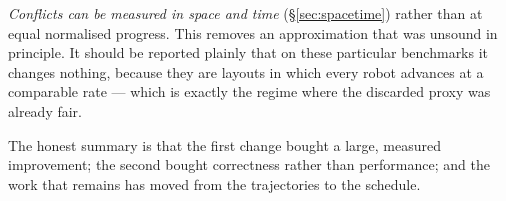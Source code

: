 \documentclass[11pt,a4paper]{article}
\begin{document}
\emph{Conflicts can be measured in space and time} (\S\ref{sec:spacetime}) rather than at
equal normalised progress. This removes an approximation that was unsound in principle. It
should be reported plainly that on these particular benchmarks it changes nothing, because
they are layouts in which every robot advances at a comparable rate --- which is exactly the
regime where the discarded proxy was already fair.

The honest summary is that the first change bought a large, measured improvement; the second
bought correctness rather than performance; and the work that remains has moved from the
trajectories to the schedule.
\end{document}
